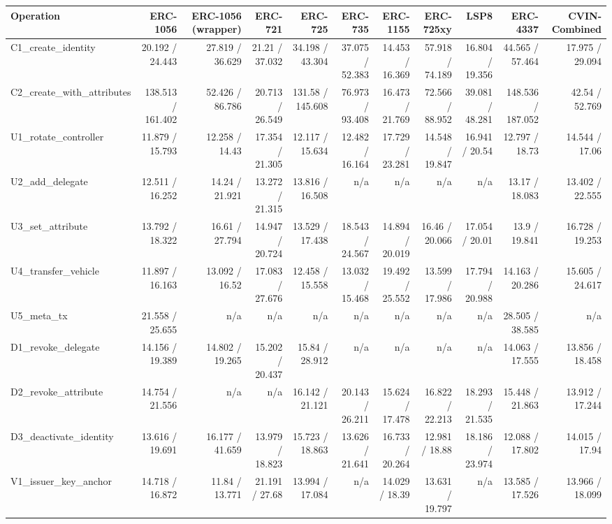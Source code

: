 \begin{table}[ht]
\centering
\small
\begin{tabular}{lrrrrrrrrrr}
\toprule
Operation & ERC-1056 & ERC-1056 (wrapper) & ERC-721 & ERC-725 & ERC-735 & ERC-1155 & ERC-725xy & LSP8 & ERC-4337 & CVIN-Combined \\
\midrule
C1\_create\_identity & 20.192 / 24.443 & 27.819 / 36.629 & 21.21 / 37.032 & 34.198 / 43.304 & 37.075 / 52.383 & 14.453 / 16.369 & 57.918 / 74.189 & 16.804 / 19.356 & 44.565 / 57.464 & 17.975 / 29.094 \\
C2\_create\_with\_attributes & 138.513 / 161.402 & 52.426 / 86.786 & 20.713 / 26.549 & 131.58 / 145.608 & 76.973 / 93.408 & 16.473 / 21.769 & 72.566 / 88.952 & 39.081 / 48.281 & 148.536 / 187.052 & 42.54 / 52.769 \\
U1\_rotate\_controller & 11.879 / 15.793 & 12.258 / 14.43 & 17.354 / 21.305 & 12.117 / 15.634 & 12.482 / 16.164 & 17.729 / 23.281 & 14.548 / 19.847 & 16.941 / 20.54 & 12.797 / 18.73 & 14.544 / 17.06 \\
U2\_add\_delegate & 12.511 / 16.252 & 14.24 / 21.921 & 13.272 / 21.315 & 13.816 / 16.508 & n/a & n/a & n/a & n/a & 13.17 / 18.083 & 13.402 / 22.555 \\
U3\_set\_attribute & 13.792 / 18.322 & 16.61 / 27.794 & 14.947 / 20.724 & 13.529 / 17.438 & 18.543 / 24.567 & 14.894 / 20.019 & 16.46 / 20.066 & 17.054 / 20.01 & 13.9 / 19.841 & 16.728 / 19.253 \\
U4\_transfer\_vehicle & 11.897 / 16.163 & 13.092 / 16.52 & 17.083 / 27.676 & 12.458 / 15.558 & 13.032 / 15.468 & 19.492 / 25.552 & 13.599 / 17.986 & 17.794 / 20.988 & 14.163 / 20.286 & 15.605 / 24.617 \\
U5\_meta\_tx & 21.558 / 25.655 & n/a & n/a & n/a & n/a & n/a & n/a & n/a & 28.505 / 38.585 & n/a \\
D1\_revoke\_delegate & 14.156 / 19.389 & 14.802 / 19.265 & 15.202 / 20.437 & 15.84 / 28.912 & n/a & n/a & n/a & n/a & 14.063 / 17.555 & 13.856 / 18.458 \\
D2\_revoke\_attribute & 14.754 / 21.556 & n/a & n/a & 16.142 / 21.121 & 20.143 / 26.211 & 15.624 / 17.478 & 16.822 / 22.213 & 18.293 / 21.535 & 15.448 / 21.863 & 13.912 / 17.244 \\
D3\_deactivate\_identity & 13.616 / 19.691 & 16.177 / 41.659 & 13.979 / 18.823 & 15.723 / 18.863 & 13.626 / 21.641 & 16.733 / 20.264 & 12.981 / 18.88 & 18.186 / 23.974 & 12.088 / 17.802 & 14.015 / 17.94 \\
V1\_issuer\_key\_anchor & 14.718 / 16.872 & 11.84 / 13.771 & 21.191 / 27.68 & 13.994 / 17.084 & n/a & 14.029 / 18.39 & 13.631 / 19.797 & n/a & 13.585 / 17.526 & 13.966 / 18.099 \\

\end{tabular}
\end{table}

